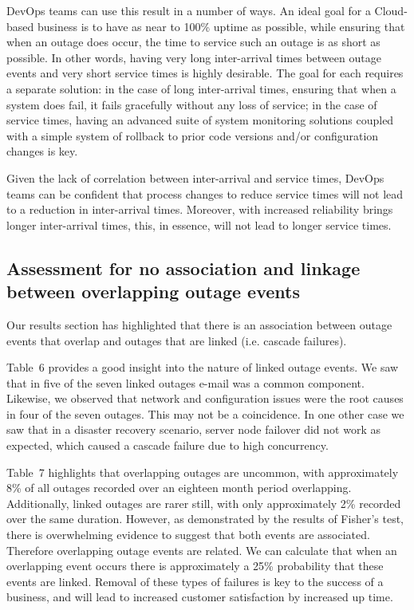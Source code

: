 \documentclass[5p]{elsarticle}
\begin{document}
DevOps teams can use this result in a number of ways. An ideal goal for a Cloud-based business is to have as near to 100\% uptime as possible, while ensuring that when an outage does occur, the time to service such an outage is as short as possible. In other words, having very long inter-arrival times between outage events and very short service times is highly desirable. The goal for each requires a separate solution: in the case of long inter-arrival times, ensuring that when a system does fail, it fails gracefully without any loss of service; in the case of service times, having an advanced suite of system monitoring solutions coupled with a simple system of rollback to prior code versions and/or configuration changes is key. 

Given the lack of correlation between inter-arrival and service times, DevOps teams can be confident that process changes to reduce service times will not lead to a reduction in inter-arrival times. Moreover, with increased reliability brings longer inter-arrival times, this, in essence, will not lead to longer service times.


\subsection{Assessment for no association and linkage between overlapping outage events}

Our results section has highlighted that there is an association between outage events that overlap and outages that are linked (i.e. cascade failures).

Table~6 provides a good insight into the nature of linked outage events. We saw that in five of the seven linked outages e-mail was a common component. Likewise, we observed that network and configuration issues were the root causes in four of the seven outages. This may not be a coincidence. In one other case we saw that in a disaster recovery scenario, server node failover did not work as expected, which caused a cascade failure due to high concurrency.

Table~7 highlights that overlapping outages are uncommon, with approximately 8\% of all outages recorded over an eighteen month period overlapping. Additionally, linked outages are rarer still, with only approximately 2\% recorded over the same duration. However, as demonstrated by the results of Fisher's test, there is overwhelming evidence to suggest that both events are associated. Therefore overlapping outage events are related. We can calculate that when an overlapping event occurs there is approximately a 25\% probability that these events are linked. Removal of these types of failures is key to the success of a business, and will lead to increased customer satisfaction by increased up time. 
\end{document}
